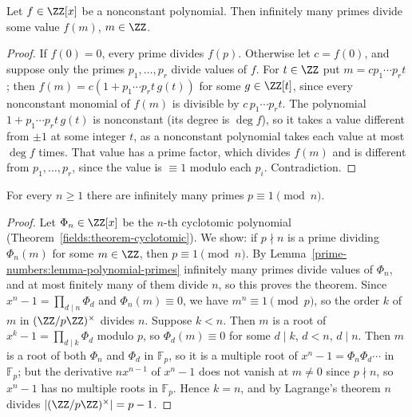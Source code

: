 \begin{lemma}\label{prime-numbers:lemma-polynomial-primes}
Let $f \in \ZZ[x]$ be a nonconstant polynomial. Then infinitely many primes divide some value $f(m)$, $m \in \ZZ$.
\end{lemma}

\begin{proof}
If $f(0) = 0$, every prime divides $f(p)$. Otherwise let $c = f(0)$, and suppose only the primes $p_1, \ldots, p_r$ divide values of $f$. For $t \in \ZZ$ put $m = cp_1 \cdots p_rt$; then
$f(m) = c(1 + p_1 \cdots p_rt\,g(t))$ for some $g \in \ZZ[t]$, since every nonconstant monomial of $f(m)$ is divisible by $c\,p_1 \cdots p_rt$. The polynomial $1 + p_1 \cdots p_rt\,g(t)$ is
nonconstant (its degree is $\deg f$), so it takes a value different from $\pm 1$ at some integer $t$, as a nonconstant polynomial takes each value at most $\deg f$ times. That value has a prime
factor, which divides $f(m)$ and is different from $p_1, \ldots, p_r$, since the value is $\equiv 1$ modulo each $p_i$. Contradiction.
\end{proof}

\begin{theorem}\label{prime-numbers:theorem-one-mod-n}
For every $n \geq 1$ there are infinitely many primes $p \equiv 1 \pmod n$.
\end{theorem}

\begin{proof}
Let $\Phi_n \in \ZZ[x]$ be the $n$-th cyclotomic polynomial (Theorem~\ref{fields:theorem-cyclotomic}). We show: if $p \nmid n$ is a prime dividing $\Phi_n(m)$ for some $m \in \ZZ$, then
$p \equiv 1 \pmod n$. By Lemma~\ref{prime-numbers:lemma-polynomial-primes} infinitely many primes divide values of $\Phi_n$, and at most finitely many of them divide $n$, so this proves the theorem.
Since $x^n - 1 = \prod_{d \mid n}\Phi_d$ and $\Phi_n(m) \equiv 0$, we have $m^n \equiv 1 \pmod p$, so the order $k$ of $m$ in $(\ZZ/p\ZZ)^\times$ divides $n$. Suppose $k < n$. Then $m$ is a root of
$x^k - 1 = \prod_{d \mid k}\Phi_d$ modulo $p$, so $\Phi_d(m) \equiv 0$ for some $d \mid k$, $d < n$, $d \mid n$. Then $m$ is a root of both $\Phi_n$ and $\Phi_d$ in $\mathbb{F}_p$, so it is a multiple
root of $x^n - 1 = \Phi_n\Phi_d \cdots$ in $\mathbb{F}_p$; but the derivative $nx^{n-1}$ of $x^n - 1$ does not vanish at $m \neq 0$ since $p \nmid n$, so $x^n - 1$ has no multiple roots in
$\mathbb{F}_p$. Hence $k = n$, and by Lagrange's theorem $n$ divides $|(\ZZ/p\ZZ)^\times| = p - 1$.
\end{proof}

